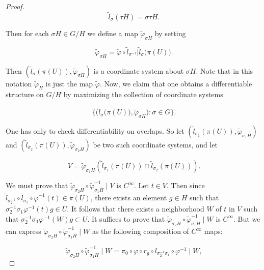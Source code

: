 \begin{proof}
\begin{equation}
\tag{7}\label{eq:3.58:7}
\tilde{l}_{\sigma}(\tau H)=\sigma\tau H.
\end{equation}

Then for each $\sigma H \in G/H$ we define a map $\tilde{\varphi}_{\sigma H}$ by setting

\begin{equation}
\tag{8}\label{eq:3.58:8}
\tilde{\varphi}_{\sigma H}=\tilde{\varphi}\circ\tilde{l}_{\sigma^{-1}}\big|\tilde{l}_{\sigma}\big(\pi(U)\big).
\end{equation}

Then  $ (\tilde{l}_{\sigma}(\pi(U)), \tilde{\varphi}_{\sigma H}) $ is a coordinate system about  $ \sigma H $. Note that in this notation  $ \tilde{\varphi}_{H} $ is just the map  $ \tilde{\varphi} $. Now, we claim that one obtains a differentiable structure on  $ G/H $ by maximizing the collection of coordinate systems

\begin{equation}
\tag{9}\label{eq:3.58:9}
\big\{\big(\tilde{l}_{\sigma}\big(\pi(U)\big),\tilde{\varphi}_{\sigma H}\big)\colon\sigma\in G\big\}.
\end{equation}

One has only to check differentiability on overlaps. So let  $ (\tilde{l}_{\sigma_{1}}(\pi(U)), \tilde{\varphi}_{\sigma_{1}H}) $ and  $ (\tilde{l}_{\sigma_{2}}(\pi(U)), \tilde{\varphi}_{\sigma_{2}H}) $ be two such coordinate systems, and let

\begin{equation}
\tag{10}\label{eq:3.58:10}
V=\tilde{\varphi}_{\sigma_{1}H}(\tilde{l}_{\sigma_{1}}(\pi(U))\cap\tilde{l}_{\sigma_{2}}(\pi(U))).
\end{equation}

We must prove that $\tilde{\varphi}_{\sigma_2H} \circ \tilde{\varphi}_{\sigma_1H}^{-1} \mid V$ is $C^\infty$. Let $t \in V$. Then since $\tilde{l}_{\sigma_2^{-1}} \circ \tilde{l}_{\sigma_1} \circ \tilde{\varphi}^{-1}(t) \in \pi(U)$, there exists an element $g \in H$ such that $\sigma_2^{-1} \sigma_1 \varphi^{-1}(t) g \in U$. It follows that there exists a neighborhood $W$ of $t$ in $V$ such that $\sigma_2^{-1} \sigma_1 \varphi^{-1}(W) g \subset U$. It suffices to prove that $\tilde{\varphi}_{\sigma_2H} \circ \tilde{\varphi}_{\sigma_1H}^{-1} \mid W$ is $C^\infty$. But we can express $\tilde{\varphi}_{\sigma_2H} \circ \tilde{\varphi}_{\sigma_1H}^{-1} \mid W$ as the following composition of $C^\infty$ maps:

\begin{equation}
\tag{11}\label{eq:3.58:11}
\tilde{\varphi}_{\sigma_{2}H}\circ\tilde{\varphi}_{\sigma_{1}H}^{-1}\mid W=\pi_{0}\circ\varphi\circ r_{g}\circ l_{\sigma_{2}^{-1}\sigma_{1}}\circ\varphi^{-1}\mid W,
\end{equation}


\end{proof}
